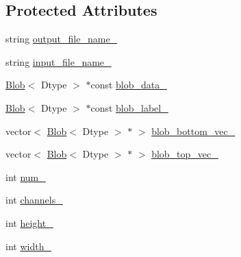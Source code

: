 \subsection*{Protected Attributes}
\begin{DoxyCompactItemize}
\item 
string \hyperlink{classcaffe_1_1_h_d_f5_output_layer_test_a5ba970f78ba51ce6362c6e3a1245e9ad}{output\+\_\+file\+\_\+name\+\_\+}
\item 
string \hyperlink{classcaffe_1_1_h_d_f5_output_layer_test_a0174a018fc1542aa473d53e406c37288}{input\+\_\+file\+\_\+name\+\_\+}
\item 
\hyperlink{classcaffe_1_1_blob}{Blob}$<$ Dtype $>$ $\ast$const \hyperlink{classcaffe_1_1_h_d_f5_output_layer_test_a68d23919519dc2fccf5f851dc67bb03e}{blob\+\_\+data\+\_\+}
\item 
\hyperlink{classcaffe_1_1_blob}{Blob}$<$ Dtype $>$ $\ast$const \hyperlink{classcaffe_1_1_h_d_f5_output_layer_test_aa87f34a2f1fed9e69cebe794fef7e1fb}{blob\+\_\+label\+\_\+}
\item 
vector$<$ \hyperlink{classcaffe_1_1_blob}{Blob}$<$ Dtype $>$ $\ast$ $>$ \hyperlink{classcaffe_1_1_h_d_f5_output_layer_test_a954c71b6deb34d3c68f41e74a98cb707}{blob\+\_\+bottom\+\_\+vec\+\_\+}
\item 
vector$<$ \hyperlink{classcaffe_1_1_blob}{Blob}$<$ Dtype $>$ $\ast$ $>$ \hyperlink{classcaffe_1_1_h_d_f5_output_layer_test_a7d062445759c5dc03e94de9e78794311}{blob\+\_\+top\+\_\+vec\+\_\+}
\item 
int \hyperlink{classcaffe_1_1_h_d_f5_output_layer_test_a7a7fca0de69992efdaef17f80a47b373}{num\+\_\+}
\item 
int \hyperlink{classcaffe_1_1_h_d_f5_output_layer_test_a08738f3c6c8b50d963684e9b036f1402}{channels\+\_\+}
\item 
int \hyperlink{classcaffe_1_1_h_d_f5_output_layer_test_a542fea46c7211a5e74aa414291414e0d}{height\+\_\+}
\item 
int \hyperlink{classcaffe_1_1_h_d_f5_output_layer_test_a867e7d0a5fc961566ed6be297f292401}{width\+\_\+}
\end{DoxyCompactItemize}


